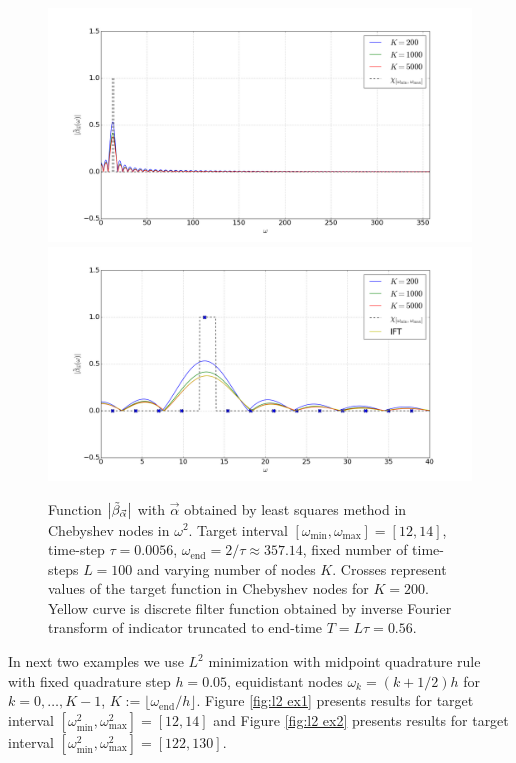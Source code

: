 \documentclass[a4paper,11pt,bibliography=totoc,listof=totoc,headinclude=true,cleardoublepage=empty,oneside]{scrbook}
\newcommand{\dffv}{\Tilde{\beta}_{\Vec{\alpha}}}
\newcommand{\e}{\mathrm{end}}
\begin{document}
\begin{figure}
    \centering
    \includegraphics[width=1\linewidth]{latex//images//cheb_least_sq/Figure_1.png}
    \includegraphics[width=1\linewidth]{latex//images//cheb_least_sq/Figure_2.png}
    \caption{Function $\left|\dffv\right|$ with $\Vec{\alpha}$ obtained by least squares method in Chebyshev nodes in $\omega^2$. Target interval $\left[\omega_{\min}, \omega_{\max} \right] = [12, 14]$, time-step $\tau = 0.0056$, $\omega_\e = 2/\tau \approx 357.14$, fixed number of time-steps $L=100$ and varying number of nodes $K$. Crosses represent values of the target function in Chebyshev nodes for $K=200$. Yellow curve is discrete filter function obtained by inverse Fourier transform of indicator truncated to end-time $T=L\tau = 0.56$.}
    \label{fig:cheb least sq}
\end{figure}

In next two examples we use $L^2$ minimization with midpoint quadrature rule with fixed quadrature step $h=0.05$, equidistant nodes $\omega_k = (k+1/2)h$ for $k=0,\dots, K-1$, $K:= \lfloor\omega_\e/h\rfloor$. Figure \ref{fig:l2 ex1} presents results for target interval $\left[\omega_{\min}^2, \omega_{\max}^2\right] = [12, 14]$ and Figure \ref{fig:l2 ex2} presents results for target interval $\left[\omega_{\min}^2, \omega_{\max}^2\right] = [122, 130]$. 
\end{document}
